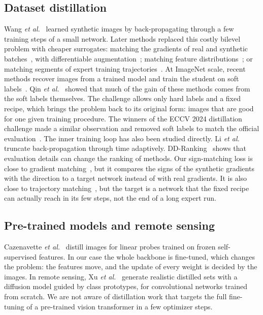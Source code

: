 \documentclass[journal]{IEEEtran}
\begin{document}
\subsection{Dataset distillation}
Wang \emph{et al.}~\cite{wang2018dd} learned synthetic images by back-propagating through a few training steps of a
small network. Later methods replaced this costly bilevel problem with cheaper surrogates: matching the gradients
of real and synthetic batches~\cite{zhao2021dc}, with differentiable augmentation~\cite{zhao2021dsa}; matching
feature distributions~\cite{zhao2023dm}; or matching segments of expert training
trajectories~\cite{cazenavette2022mtt,guo2024datm}. At ImageNet scale, recent methods recover images from a trained
model and train the student on soft labels~\cite{yin2023sre2l,sun2024rded}. Qin \emph{et al.}~\cite{qin2024label}
showed that much of the gain of these methods comes from the soft labels themselves. The challenge allows only hard
labels and a fixed recipe, which brings the problem back to its original form: images that are good for one given
training procedure. The winners of the ECCV 2024 distillation challenge made a similar observation and removed soft
labels to match the official evaluation~\cite{zhou2024mdatm}. The inner training loop has also been studied
directly. Li \emph{et al.}~\cite{li2025atbptt} truncate back-propagation through time adaptively. DD-Ranking~\cite{li2025ddranking}
shows that evaluation details can change the ranking of methods. Our sign-matching loss is close to gradient
matching~\cite{zhao2021dc}, but it compares the signs of the synthetic gradients with the direction to a target
network instead of with real gradients. It is also close to trajectory matching~\cite{cazenavette2022mtt}, but the
target is a network that the fixed recipe can actually reach in its few steps, not the end of a long expert run.

\subsection{Pre-trained models and remote sensing}
Cazenavette \emph{et al.}~\cite{cazenavette2025lgm} distill images for linear probes trained on frozen
self-supervised features. In our case the whole backbone is fine-tuned, which changes the problem: the features move,
and the update of every weight is decided by the images. In remote sensing, Xu \emph{et al.}~\cite{xu2026dpd}
generate realistic distilled sets with a diffusion model guided by class prototypes, for convolutional networks
trained from scratch. We are not aware of distillation work that targets the full fine-tuning of a pre-trained
vision transformer in a few optimizer steps.
\end{document}
